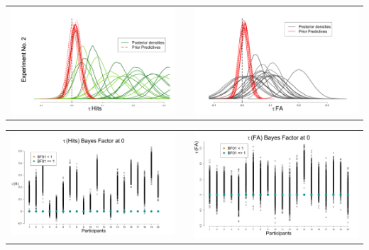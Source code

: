 \documentclass[final]{beamer}
\newlength{\onecolwid}
\newlength{\twocolwid}
\begin{document}
\begin{frame}[t]
\begin{columns}[t]
\begin{column}{\twocolwid}
\begin{columns}[t,totalwidth=\twocolwid]
\begin{column}{\onecolwid}
\begin{alertblock}{}
\begin{center}
\begin{tabular}{ccc}
\includegraphics[width=0.48\linewidth]{Figures/3-Exp2_TauH.pdf}  & \hfill & \includegraphics[width=0.48\linewidth]{Figures/3-Exp2_TauF.pdf}
\end{tabular}
\end{center}

\begin{center}
\begin{tabular}{ccc}
\includegraphics[width=0.48\linewidth]{Figures/3-Exp2_BFH0.pdf}  & \hfill & \includegraphics[width=0.48\linewidth]{Figures/3-Exp2_BFF0.pdf}
\end{tabular}
\end{center}


\end{alertblock}





\end{column}
\end{columns}
\end{column}
\end{columns}
\end{frame}
\end{document}
